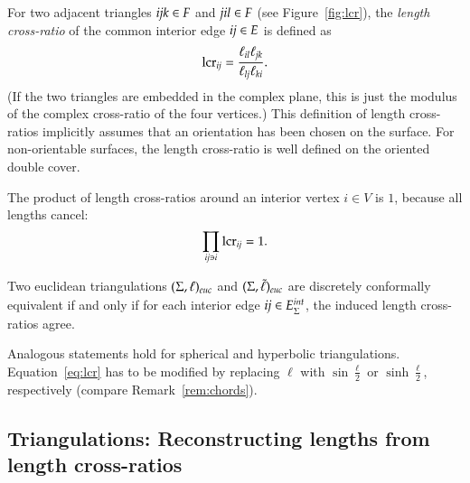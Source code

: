 \documentclass[Thesis]{subfiles}
\begin{document}
For two adjacent triangles ${\it ijk}\in F$ and ${\it jil}\in F$ (see Figure~\ref{fig:lcr}), the
\emph{length cross-ratio} of the common interior edge ${\it ij}\in E$ is defined
as
\begin{equation}
\label{eq:lcr}
\operatorname{lcr}_{\it ij}=\frac{\ell_{\it il}\ell_{\it jk}}{\ell_{\it lj}\ell_{\it ki}}.
\end{equation}
(If the two triangles are embedded in the complex plane, this is just
the modulus of the complex cross-ratio of the four vertices.)  This
definition of length cross-ratios implicitly assumes that an
orientation has been chosen on the surface. For non-orientable
surfaces, the length cross-ratio is well defined on the oriented
double cover.

The product of length cross-ratios around an interior vertex $i\in V$ is $1$, because all lengths cancel:
\begin{equation}
  \label{eq:lcr_product}
  \prod_{{\it ij}\ni i} \operatorname{lcr}_{\it ij} = 1.
\end{equation}

\begin{proposition}%
  Two euclidean triangulations $(\Sigma, \ell)_{\euc}$ and $(\Sigma,
  \tilde \ell)_{\euc}$ are discretely conformally equivalent if and
  only if for each interior edge ${\it ij}\in E^{\mathit{int}}_{\Sigma}$, the induced length
  cross-ratios agree.
\end{proposition}

\begin{remark}
  Analogous statements hold for spherical and hyperbolic
  triangulations. Equation~\eqref{eq:lcr} has to be modified by
  replacing $\ell$ with $\sin\frac{\ell}{2}$ or $\sinh\frac{\ell}{2}$,
  respectively (compare Remark~\ref{rem:chords}).
\end{remark}

\subsection{Triangulations: Reconstructing lengths from length cross-ratios}
\label{sec:ell_from_lcr}
\end{document}
